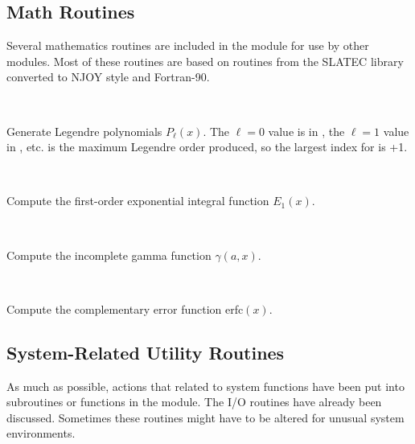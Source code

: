 \subsection{Math Routines}
\label{ssNJOY_math}

Several mathematics routines are included in the
 module
for use by other modules.  Most of these routines are based on
routines from the SLATEC library converted to NJOY style and Fortran-90.

\begin{description}
\begin{singlespace}
\item[\cword{legndr(x,p,np)}] ~\par
Generate Legendre polynomials $P_{\ell}(x)$.  The $\ell=0$ value
is in , the $\ell=1$ value in , etc.
 is the maximum Legendre order produced, so the
largest index for  is +1.

\item[\cword{e1(x)}] ~\par
Compute the first-order exponential integral function $E_1(x)$.

\item[\cword{gami(a,x)}] ~\par
Compute the incomplete gamma function $\gamma(a,x)$.

\item[\cword{erfc(x)}] ~\par
Compute the complementary error function erfc$(x)$.
\end{singlespace}
\end{description}


\subsection{System-Related Utility Routines}
\label{ssNJOY_sysutil}

As much as possible, actions that related to system functions
have been put into subroutines or functions in the
 module.
The I/O routines have already been discussed.  Sometimes these
routines might have to be altered for unusual system environments.

